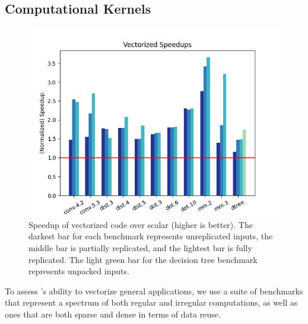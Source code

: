 \subsection{Computational Kernels}
\begin{figure}
    \includegraphics[width=0.7\linewidth]{figures/graphs/vector_speedups.png}
    \caption{Speedup of vectorized code over scalar (higher is better). The darkest bar for each benchmark represents unreplicated inputs, the middle bar is partially replicated, and the lightest bar is fully replicated. The light green bar for the decision tree benchmark represents unpacked inputs.}\label{fig:vector-speedups}
\end{figure}

To assess \system's ability to vectorize general applications, we use a suite of benchmarks that represent a spectrum of both regular and irregular computations, as well as ones that are both sparse and dense in terms of data reuse.

